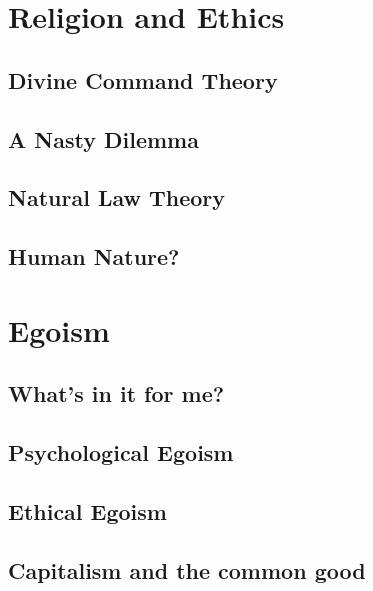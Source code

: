 \documentclass[justified]{tufte-book}
\begin{document}
\hypertarget{religion-and-ethics}{%
\chapter{Religion and Ethics}\label{religion-and-ethics}}

\hypertarget{divine-command-theory}{%
\section{Divine Command Theory}\label{divine-command-theory}}

\hypertarget{a-nasty-dilemma}{%
\section{A Nasty Dilemma}\label{a-nasty-dilemma}}

\hypertarget{natural-law-theory}{%
\section{Natural Law Theory}\label{natural-law-theory}}

\hypertarget{human-nature}{%
\section{Human Nature?}\label{human-nature}}

\hypertarget{egoism}{%
\chapter{Egoism}\label{egoism}}

\hypertarget{whats-in-it-for-me}{%
\section{What's in it for me?}\label{whats-in-it-for-me}}

\hypertarget{psychological-egoism}{%
\section{Psychological Egoism}\label{psychological-egoism}}

\hypertarget{ethical-egoism}{%
\section{Ethical Egoism}\label{ethical-egoism}}

\hypertarget{capitalism-and-the-common-good}{%
\section{Capitalism and the common good}\label{capitalism-and-the-common-good}}
\end{document}
